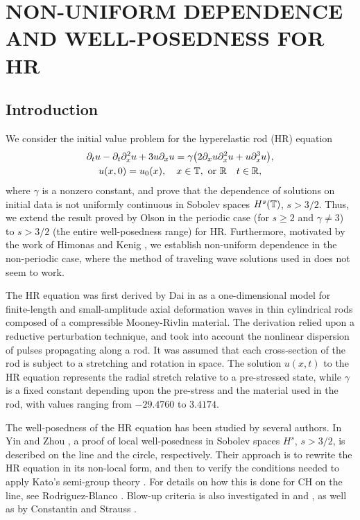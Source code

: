 \chapter{NON-UNIFORM DEPENDENCE AND WELL-POSEDNESS FOR 
HR}
\section{Introduction}
%
We consider the  initial value problem for
the hyperelastic rod (HR)  equation
%
%
\begin{gather}
\label{hr}
\partial_t u
-
\partial_t \partial_x^2 u
+
3u\partial_x u
=
\gamma \big (
2\partial_x u \partial_x^2 u
+
u \partial_x^3 u
\big ),
\\
\label{hr-data} u(x, 0) = u_0 (x),
\quad x \in \mathbb{T}, \ \text{or} \ \mathbb{R} \quad t \in \mathbb{R},
\end{gather}
%
%
where $\gamma$ is a nonzero constant,
and prove that the dependence of solutions on initial data is not uniformly 
continuous in Sobolev spaces $H^s(\mathbb{T})$, $s>3/2$.
Thus, we extend the result proved by Olson 
\cite{Olson_2006_Non-uniform-dep} in the periodic
case (for $s\ge 2$ and $\gamma \ne 3$)  to  $s>3/2$ (the entire 
well-posedness range) for HR\@. Furthermore,  motivated by the work of
Himonas  and Kenig \cite{Himonas:2009fk},
we establish non-uniform dependence
in the non-periodic case, where the method of traveling wave solutions used in  
\cite{Olson_2006_Non-uniform-dep} does not seem to work.
%
%

The HR equation was first
derived by Dai in \cite{Dai_1998_Model-equations} as a one-dimensional 
model for finite-length and
small-amplitude axial deformation waves in thin cylindrical
rods composed of a compressible Mooney-Rivlin
material. The derivation relied upon a reductive perturbation technique, 
and took into account the nonlinear dispersion of pulses propagating 
along a rod. It was assumed that each cross-section of the rod is 
subject to a stretching and rotation in space. The solution $u(x,t)$ to the 
HR equation represents the radial stretch relative
to a pre-stressed state, while $\gamma$ is a fixed constant depending upon 
the pre-stress and the material used in
the rod, with values ranging from $- 29.4760$ to $3.4174$.

%
The well-posedness of the HR equation has been studied by several authors. 
In Yin \cite{Yin_2003_On-the-Cauchy-p} and Zhou 
\cite{Zhou_2005_Local-well-pose}, a proof of local well-posedness in Sobolev 
spaces $H^s$,  $s > 3/2$, is described  on the line and the circle, respectively. 
Their approach is to rewrite the HR equation   
in its non-local form, and then to verify the conditions needed to apply 
Kato's semi-group theory \cite{Kato:1975}. 
For details on how this is done for CH on the line, see Rodriguez-Blanco 
\cite{Rodriguez-Blanco_2001_On-the-Cauchy-p}. Blow-up criteria 
is also investigated in \cite{Yin_2003_On-the-Cauchy-p} and 
\cite{Zhou_2005_Local-well-pose}, as well as by Constantin and Strauss 
\cite{Constantin_2000_Stability-of-a-}. 


